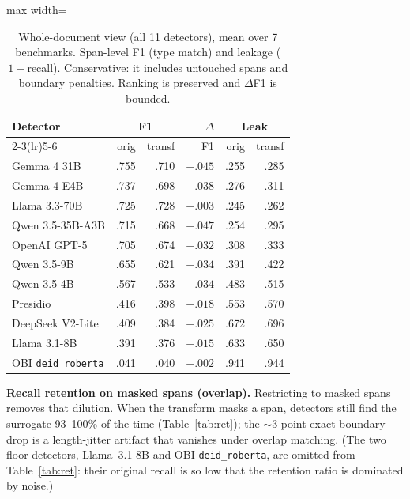\documentclass[11pt]{article}
\newcommand{\tp}[1]{\texttt{#1}}
\begin{document}
\begin{table}[t]\centering\small
\begin{adjustbox}{max width=\columnwidth}%
\begin{tabular}{lrrrrr}
\toprule
Detector & \multicolumn{2}{c}{F1} & $\Delta$ & \multicolumn{2}{c}{Leak}\\
\cmidrule(lr){2-3}\cmidrule(lr){5-6}
 & orig & transf & F1 & orig & transf\\
\midrule
Gemma 4 31B & .755 & .710 & $-.045$ & .255 & .285\\
Gemma 4 E4B & .737 & .698 & $-.038$ & .276 & .311\\
Llama 3.3-70B & .725 & .728 & $+.003$ & .245 & .262\\
Qwen 3.5-35B-A3B & .715 & .668 & $-.047$ & .254 & .295\\
OpenAI GPT-5 & .705 & .674 & $-.032$ & .308 & .333\\
Qwen 3.5-9B & .655 & .621 & $-.034$ & .391 & .422\\
Qwen 3.5-4B & .567 & .533 & $-.034$ & .483 & .515\\
Presidio & .416 & .398 & $-.018$ & .553 & .570\\
DeepSeek V2-Lite & .409 & .384 & $-.025$ & .672 & .696\\
Llama 3.1-8B & .391 & .376 & $-.015$ & .633 & .650\\
OBI \tp{deid\_roberta} & .041 & .040 & $-.002$ & .941 & .944\\
\bottomrule
\end{tabular}
\end{adjustbox}
\caption{Whole-document view (all 11 detectors), mean over 7 benchmarks. Span-level F1 (type match) and leakage ($1-$recall). Conservative: it includes untouched spans and boundary penalties. Ranking is preserved and $\Delta$F1 is bounded.}\label{tab:fullf1}
\end{table}

\textbf{Recall retention on masked spans (overlap).} Restricting to masked spans removes that dilution. When the transform masks a span, detectors still find the surrogate 93--100\% of the time (Table~\ref{tab:ret}); the $\sim$3-point exact-boundary drop is a length-jitter artifact that vanishes under overlap matching. (The two floor detectors, Llama~3.1-8B and OBI \tp{deid\_roberta}, are omitted from Table~\ref{tab:ret}: their original recall is so low that the retention ratio is dominated by noise.)
\end{document}
